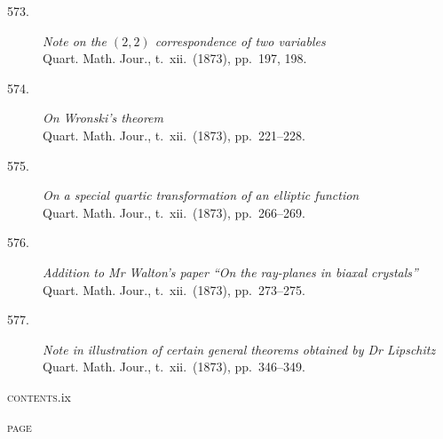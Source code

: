 \documentclass[11pt]{article}
\begin{document}
\begin{description}
\item[573.] \textit{Note on the $(2,2)$ correspondence of two variables}\\
\hspace*{1em}\small Quart. Math. Jour., t.~xii.\ (1873), pp.~197, 198.

\item[574.] \textit{On Wronski's theorem}\\
\hspace*{1em}\small Quart. Math. Jour., t.~xii.\ (1873), pp.~221--228.

\item[575.] \textit{On a special quartic transformation of an elliptic function}\\
\hspace*{1em}\small Quart. Math. Jour., t.~xii.\ (1873), pp.~266--269.

\item[576.] \textit{Addition to Mr Walton's paper ``On the ray-planes in biaxal crystals''}\\
\hspace*{1em}\small Quart. Math. Jour., t.~xii.\ (1873), pp.~273--275.

\item[577.] \textit{Note in illustration of certain general theorems obtained by Dr Lipschitz}\\
\hspace*{1em}\small Quart. Math. Jour., t.~xii.\ (1873), pp.~346--349.
\end{description}
\newpage

\thispagestyle{empty}
\noindent\small\textsc{contents.}\hfill ix
\vspace*{1em}

\noindent\hfill\textsc{page}

\medskip
\end{document}
